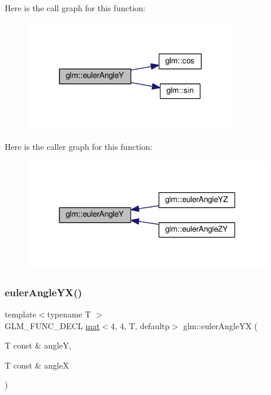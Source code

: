 Here is the call graph for this function\+:
\nopagebreak
\begin{figure}[H]
\begin{center}
\leavevmode
\includegraphics[width=261pt]{d2/d7e/group__gtx__euler__angles_gab84bf4746805fd69b8ecbb230e3974c5_cgraph}
\end{center}
\end{figure}
Here is the caller graph for this function\+:
\nopagebreak
\begin{figure}[H]
\begin{center}
\leavevmode
\includegraphics[width=304pt]{d2/d7e/group__gtx__euler__angles_gab84bf4746805fd69b8ecbb230e3974c5_icgraph}
\end{center}
\end{figure}
\mbox{\label{group__gtx__euler__angles_ga4f57e6dd25c3cffbbd4daa6ef3f4486d}} 
\subsubsection{\texorpdfstring{euler\+Angle\+Y\+X()}{eulerAngleYX()}}
{\footnotesize\ttfamily template$<$typename T $>$ \\
G\+L\+M\+\_\+\+F\+U\+N\+C\+\_\+\+D\+E\+CL \hyperlink{structglm_1_1mat}{mat}$<$4, 4, T, defaultp$>$ glm\+::euler\+Angle\+YX (\begin{DoxyParamCaption}\item[{T const \&}]{angleY,  }\item[{T const \&}]{angleX }\end{DoxyParamCaption})}



